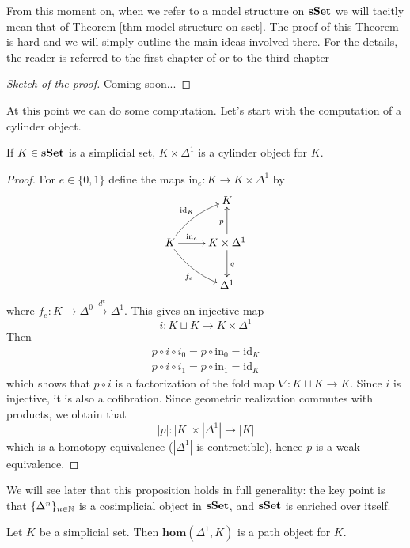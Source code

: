 From this moment on, when we refer to a model structure on $\mathbf{sSet}$ we will tacitly mean that of Theorem \ref{thm model structure on sset}. The proof of this Theorem is hard and we will simply outline the main ideas involved there. For the details, the reader is referred to the first chapter of \cite{gj} or to the third chapter 

\begin{proof}[Sketch of the proof]
Coming soon...
\end{proof}

At this point we can do some computation. Let's start with the computation of a cylinder object.

\begin{prop}
If $K \in \mathbf{sSet}$ is a simplicial set, $K \times \Delta^1$ is a cylinder object for $K$.
\end{prop}

\begin{proof}
For $e \in \{0,1\}$ define the maps $\mathrm{in}_e \colon K \to K \times \Delta^1$ by
\[
\xymatrix{
& K \\
K \ar@/^.5pc/[ur]^{\mathrm{id}_K} \ar@/_.5pc/[dr]_{f_e} \ar[r]^-{\mathrm{in}_e} & K \times \Delta^1 \ar[u]^p \ar[d]^q \\ & \Delta^1
}
\]
where $f_e \colon K \to \Delta^0 \xrightarrow{d^e} \Delta^1$. This gives an injective map
\[
i \colon K \sqcup K \to K \times \Delta^1
\]
Then
\begin{gather*}
p \circ i \circ i_0 = p \circ \mathrm{in}_0 = \mathrm{id}_K \\
p \circ i \circ i_1 = p \circ \mathrm{in}_1 = \mathrm{id}_K
\end{gather*}
which shows that $p \circ i$ is a factorization of the fold map $\nabla \colon K \sqcup K \to K$. Since $i$ is injective, it is also a cofibration. Since geometric realization commutes with products, we obtain that
\[
|p| \colon |K| \times |\Delta^1| \to |K|
\]
which is a homotopy equivalence ($|\Delta^1|$ is contractible), hence $p$ is a weak equivalence.
\end{proof}

We will see later that this proposition holds in full generality: the key point is that $\{\Delta^n\}_{n \in \mathbb{N}}$ is a cosimplicial object in $\mathbf{sSet}$, and $\mathbf{sSet}$ is enriched over itself.

\begin{prop}
Let $K$ be a simplicial set. Then $\mathbf{hom}(\Delta^1,K)$ is a path object for $K$.
\end{prop}

